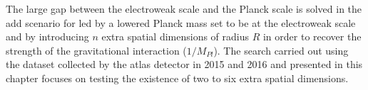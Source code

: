 The large gap between the electroweak scale and the Planck scale is solved in
the \gls{add} scenario for \gls{led} by a lowered Planck mass set to be at the
electroweak scale and by introducing $n$ extra spatial dimensions of radius $R$
in order to recover the strength of the gravitational interaction
($1/M_{Pl}$). The search carried out using the dataset collected by the
\gls{atlas} detector in 2015 and 2016 and presented in this chapter focuses on
testing the existence of two to six extra spatial dimensions.
